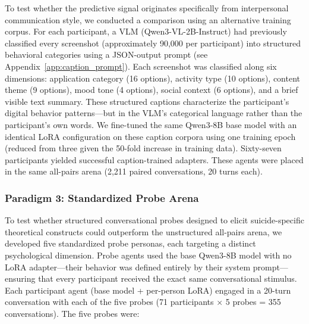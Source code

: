 \documentclass[review,12pt,authoryear]{elsarticle}
\begin{document}
To test whether the predictive signal originates specifically from interpersonal communication style, we conducted a comparison using an alternative training corpus. For each participant, a VLM (Qwen3-VL-2B-Instruct) had previously classified every screenshot (approximately 90,000 per participant) into structured behavioral categories using a JSON-output prompt (see Appendix~\ref{app:caption_prompt}). Each screenshot was classified along six dimensions: application category (16 options), activity type (10 options), content theme (9 options), mood tone (4 options), social context (6 options), and a brief visible text summary. These structured captions characterize the participant's digital behavior patterns---but in the VLM's categorical language rather than the participant's own words. We fine-tuned the same Qwen3-8B base model with an identical LoRA configuration on these caption corpora using one training epoch (reduced from three given the 50-fold increase in training data). Sixty-seven participants yielded successful caption-trained adapters. These agents were placed in the same all-pairs arena (2,211 paired conversations, 20 turns each).

\subsubsection{Paradigm 3: Standardized Probe Arena}

To test whether structured conversational probes designed to elicit suicide-specific theoretical constructs could outperform the unstructured all-pairs arena, we developed five standardized probe personas, each targeting a distinct psychological dimension. Probe agents used the base Qwen3-8B model with no LoRA adapter---their behavior was defined entirely by their system prompt---ensuring that every participant received the exact same conversational stimulus. Each participant agent (base model + per-person LoRA) engaged in a 20-turn conversation with each of the five probes (71 participants $\times$ 5 probes = 355 conversations). The five probes were:
\end{document}
